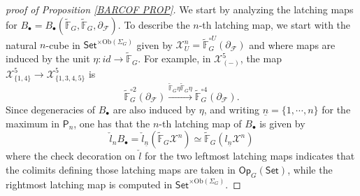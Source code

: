 \documentclass[a4paper,10pt]{article}%
\begin{document}
\begin{proof}[proof of Proposition \ref{BARCOF PROP}]
We start by analyzing the latching maps
for 
$B_{\bullet}
=
B_{\bullet}(\widetilde{\mathbb{F}}_G,
\widetilde{\mathbb{F}}_G,
\partial_{\mathcal{F}})
$.
To describe the $n$-th latching map, we start with the natural $n$-cube in 
$\mathsf{Set}^{\times \text{Ob}(\Sigma_G)}$ 
given by
$\mathcal{X}^n_U = 
\widetilde{\mathbb{F}}_G^{\circ U}
(\partial_{\mathcal{F}})$
and where maps 
are induced by the unit
$\eta \colon id \to \widetilde{\mathbb{F}}_G$.
For example, in 
$\mathcal{X}^5_{(\minus)}$,
the map 
$\mathcal{X}^5_{\{1,4\}} \to \mathcal{X}^5_{\{1,3,4,5\}}$
is 
\[
\widetilde{\mathbb{F}}_G^{\circ 2}
(\partial_{\mathcal{F}})
\xrightarrow{
\widetilde{\mathbb{F}}_G
\eta
\widetilde{\mathbb{F}}_G
\eta}
\widetilde{\mathbb{F}}_G^{\circ 4}
(\partial_{\mathcal{F}}).
\]
Since degeneracies of $B_{\bullet}$
are also induced by $\eta$,
and writing $\underline{n}=\{1,\cdots,n\}$ for the maximum in $\mathsf{P}_n$,
one has that the $n$-th latching map of $B_{\bullet}$ is given by
\[
\check{l}_n B_{\bullet} = 
\check{l}_{\underline{n}}
(\widetilde{\mathbb{F}}_G
 \mathcal{X}^n) \simeq
\widetilde{\mathbb{F}}_G
(l_{\underline{n}} \mathcal{X}^n)
\]
where the check decoration on $\check{l}$
for the two leftmost latching maps indicates that the colimits defining those latching maps are taken 
in $\mathsf{Op}_{G}(\mathsf{Set})$, while the rightmost latching map is computed in 
$\mathsf{Set}^{\times \text{Ob}(\Sigma_G)}$.


\end{proof}
\end{document}
